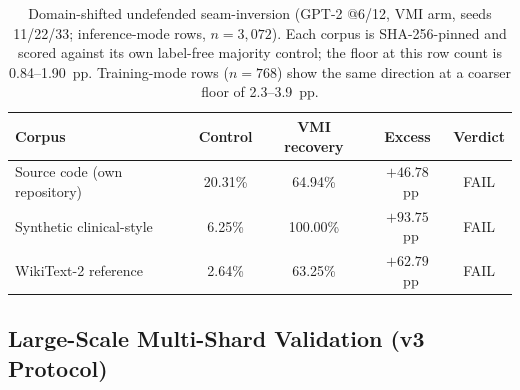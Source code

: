 \documentclass[11pt]{article}
\newcommand{\pp}{pp}
\begin{document}
\begin{table}[t]
\centering\small
\caption{Domain-shifted undefended seam-inversion (GPT-2 @6/12, VMI arm,
seeds 11/22/33; inference-mode rows, $n{=}3{,}072$). Each corpus is
SHA-256-pinned and scored against its own label-free majority control;
the floor at this row count is 0.84--1.90~\pp. Training-mode rows
($n{=}768$) show the same direction at a coarser floor of 2.3--3.9~\pp.}
\label{tab:domain}
\begin{tabular}{@{}lcccc@{}}
\toprule
Corpus & Control & VMI recovery & Excess & Verdict \\
\midrule
Source code (own repository) & 20.31\% & 64.94\% & $+46.78$~\pp & FAIL \\
Synthetic clinical-style & 6.25\% & 100.00\% & $+93.75$~\pp & FAIL \\
WikiText-2 reference & 2.64\% & 63.25\% & $+62.79$~\pp & FAIL \\
\bottomrule
\end{tabular}
\end{table}

\subsection{Large-Scale Multi-Shard Validation (v3 Protocol)}
\label{sec:v3}
\end{document}
